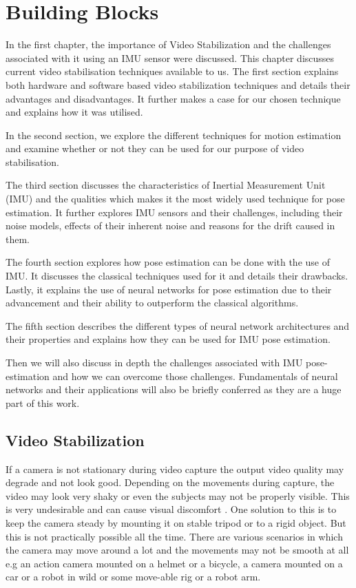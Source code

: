 \chapter{Building Blocks} \label{chapter_two}

In the first chapter, the importance of Video Stabilization and the challenges associated with it using an IMU sensor were discussed. This chapter discusses current video stabilisation techniques available to us. The first section explains both hardware and software based video stabilization techniques and details their advantages and disadvantages. It further makes a case for our chosen technique and explains how it was utilised. 

In the second section, we explore the different techniques for motion estimation and examine whether or not they can be used for our purpose of video stabilisation.

The third section discusses the characteristics of Inertial Measurement Unit (IMU) and the qualities which makes it the most widely used technique for pose estimation. It further explores IMU sensors and their challenges, including their noise models, effects of their inherent noise and reasons for the drift caused in them. 

The fourth section explores how pose estimation can be done with the use of IMU. It discusses the classical techniques used for it and details their drawbacks. Lastly, it explains the use of neural networks for pose estimation due to their advancement and their ability to outperform the classical algorithms.

The fifth section describes the different types of neural network architectures and their properties and explains how they can be used for IMU pose estimation. 

Then we will also discuss in depth the challenges associated with IMU pose-estimation and how we can overcome those challenges. Fundamentals of neural networks and their applications will also be briefly conferred as they are a huge part of this work.



\section{Video Stabilization}
\label{sec:image_stab}
If a camera is not stationary during video capture the output video quality may degrade and not look good. Depending on the movements during capture, the video may look very shaky or even the subjects may not be properly visible. This is very undesirable and can cause visual discomfort \citep{jia2012probabilistic}. One solution to this is to keep the camera steady by mounting it on stable tripod or to a rigid object. But this is not practically possible all the time. There are various scenarios in which the camera may move around a lot and the movements may not be smooth at all e.g an action camera mounted on a helmet or a bicycle, a camera mounted on a car or a robot in wild or some move-able rig or a robot arm.

